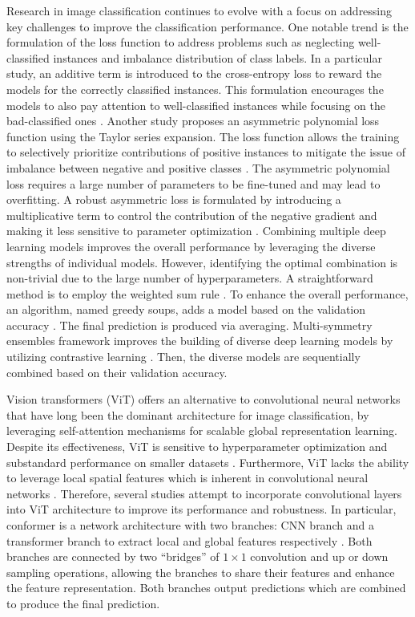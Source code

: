 \documentclass[preprint,12pt]{elsarticle}
\begin{document}
Research in image classification continues to evolve with a focus on addressing key challenges to improve the classification performance. One notable trend is the formulation of the loss function to address problems such as neglecting well-classified instances and imbalance distribution of class labels. In a particular study, an additive term is introduced to the cross-entropy loss to reward the models for the correctly classified instances. This formulation encourages the models to also pay attention to well-classified instances while focusing on the bad-classified ones \citep{zhao_well-classified_2022}. Another study proposes an asymmetric polynomial loss function using the Taylor series expansion. The loss function allows the training to selectively prioritize contributions of positive instances to mitigate the issue of imbalance between negative and positive classes \citep{huang_asymmetric_2023}. The asymmetric polynomial loss requires a large number of parameters to be fine-tuned and may lead to overfitting. A robust asymmetric loss is formulated by introducing a multiplicative term to control the contribution of the negative gradient and making it less sensitive to parameter optimization \citep{park_robust_2023}. Combining multiple deep learning models improves the overall performance by leveraging the diverse strengths of individual models. However, identifying the optimal combination is non-trivial due to the large number of hyperparameters. A straightforward method is to employ the weighted sum rule \citep{nanni_building_2023}. To enhance the overall performance, an algorithm, named greedy soups, adds a model based on the validation accuracy \citep{wortsman_model_2022}. The final prediction is produced via averaging. Multi-symmetry ensembles framework improves the building of diverse deep learning models by utilizing contrastive learning \citep{loh_multi-symmetry_2023}. Then, the diverse models are sequentially combined based on their validation accuracy.

Vision transformers (ViT) offers an alternative to convolutional neural networks that have long been the dominant architecture for image classification, by leveraging self-attention mechanisms for scalable global representation learning. Despite its effectiveness, ViT is sensitive to hyperparameter optimization and substandard performance on smaller datasets \citep{xiao_early_2021}. Furthermore, ViT lacks the ability to leverage local spatial features which is inherent in convolutional neural networks \citep{wu_cvt_2021}. Therefore, several studies attempt to incorporate convolutional layers into ViT architecture to improve its performance and robustness. In particular, conformer is a network architecture with two branches: CNN branch and a transformer branch to extract local and global features respectively \citep{peng_conformer_2023}. Both branches are connected by two “bridges” of $1 \times 1$ convolution and up or down sampling operations, allowing the branches to share their features and enhance the feature representation. Both branches output predictions which are combined to produce the final prediction. 
\end{document}
